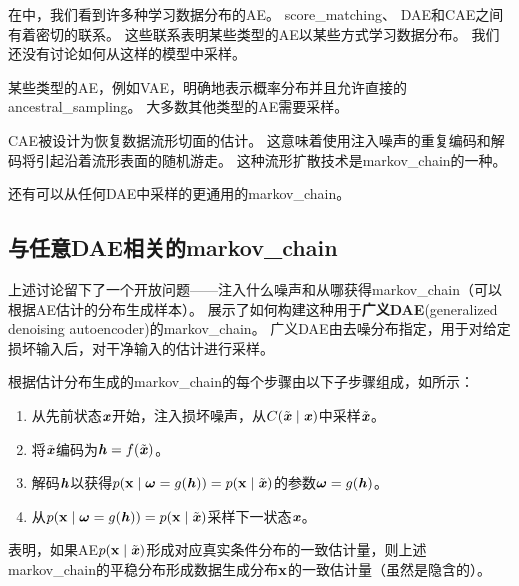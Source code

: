 在中，我们看到许多种学习数据分布的\gls{AE}。
\gls{score_matching}、 \gls{DAE}和\gls{CAE}之间有着密切的联系。
这些联系表明某些类型的\gls{AE}以某些方式学习数据分布。
我们还没有讨论如何从这样的模型中采样。


某些类型的\gls{AE}，例如\gls{VAE}，明确地表示概率分布并且允许直接的\gls{ancestral_sampling}。
大多数其他类型的\gls{AE}需要采样。

\gls{CAE}被设计为恢复数据流形切面的估计。
这意味着使用注入噪声的重复编码和解码将引起沿着流形表面的随机游走\citep{Rifai-icml2012-small,Mesnil-et-al-LW2012}。
这种流形扩散技术是\gls{markov_chain}的一种。

还有可以从任何\gls{DAE}中采样的更通用的\gls{markov_chain}。


\subsection{与任意\gls{DAE}相关的\gls{markov_chain}}
\label{sec:markov_chain_associated_with_any_denoising_autoencoder}

上述讨论留下了一个开放问题——注入什么噪声和从哪获得\gls{markov_chain}（可以根据\gls{AE}估计的分布生成样本）。
\citet{Bengio-et-al-NIPS2013-small} 展示了如何构建这种用于\textbf{广义\gls{DAE}}(generalized denoising autoencoder)的\gls{markov_chain}。
广义\gls{DAE}由去噪分布指定，用于对给定损坏输入后，对干净输入的估计进行采样。

根据估计分布生成的\gls{markov_chain}的每个步骤由以下子步骤组成，如所示：
\begin{enumerate}
 \item 从先前状态$\boldsymbol{\mathit{x}}$开始，注入损坏噪声，从$C(\tilde{\boldsymbol{\mathit{x}}}  \mid  \boldsymbol{\mathit{x}})$中采样$\tilde{\boldsymbol{\mathit{x}}}$。
 \item 将$\tilde{\boldsymbol{\mathit{x}}}$编码为$\boldsymbol{\mathit{h}} = f(\tilde{\boldsymbol{\mathit{x}}})$。
 \item 解码$\boldsymbol{\mathit{h}}$以获得$p(\mathbf{x}  \mid  \boldsymbol{\omega} = g(\boldsymbol{\mathit{h}})) = p(\mathbf{x}  \mid  \tilde{\boldsymbol{\mathit{x}}})$的参数$\boldsymbol{\omega} = g(\boldsymbol{\mathit{h}})$。
 \item 从$p(\mathbf{x}  \mid  \boldsymbol{\omega} = g(\boldsymbol{\mathit{h}})) = p(\mathbf{x}  \mid  \tilde{\boldsymbol{\mathit{x}}})$采样下一状态$\boldsymbol{\mathit{x}}$。
\end{enumerate}
\citet{Bengio-et-al-ICML-2014}表明，如果\gls{AE}$p(\mathbf{x}  \mid  \tilde{\boldsymbol{\mathit{x}}})$形成对应真实条件分布的一致估计量，则上述\gls{markov_chain}的平稳分布形成数据生成分布$\mathbf{x}$的一致估计量（虽然是隐含的）。


